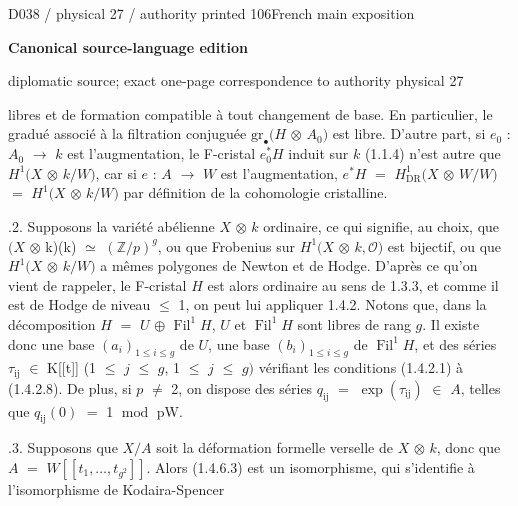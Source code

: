 \documentclass[9pt]{article}
\newcommand{\CanonText}[1]{\par{\fontsize{8.0}{9.35}\selectfont\RaggedRight #1\par}\vspace{2.2pt}}
\newcommand{\LayerTitle}{Canonical source-language edition}
\begin{document}
\noindent\begin{minipage}[t][\dimexpr\textheight-5pt\relax][t]{\textwidth}
{\sffamily\fontsize{7.3}{8.2}\selectfont\color{Quiet} D038 / physical 27 / authority printed 106\hfill French main exposition}
\par{}\vspace{4.5pt}
{\sffamily\fontsize{10.4}{11.6}\selectfont\bfseries\color{Accent} \LayerTitle}
\par{\sffamily\fontsize{6.7}{7.7}\selectfont\color{Quiet} diplomatic source; exact one-page correspondence to authority physical 27}
\vspace{5pt}
\CanonText{libres et de formation compatible à tout changement de base. En particulier, le gradué associé à la filtration conjuguée \(\text{gr}_\bullet{}(H\) \(\otimes{}\) \(A_{0})\) est libre. D'autre part, si \(e_{0}\) : \(A_{0}\) \(\to{}\) \(k\) est l'augmentation, le F-cristal \(e_{0}^{*}H\) induit sur \(k\) (1.1.4) n'est autre que \(H^{1}(X\) \(\otimes{}\) \(k/W)\), car si \(e\) : \(A\) \(\to{}\) \(W\) est l'augmentation, \(e^{*}H\) \(=\) \(H^{1}_{\mathrm{DR}}(X\) \(\otimes{}\) \(W/W)\) \(=\) \(H^{1}(X\) \(\otimes{}\) \(k/W)\) par définition de la cohomologie cristalline.}
\CanonText{2.1.2. Supposons la variété abélienne \(X\) \(\otimes{}\) \(k\) ordinaire, ce qui signifie, au choix, que \((X\) \(\otimes{}\) k)(k) \(\simeq{}\) \((\mathbb{Z}/p)^{g}\), ou que Frobenius sur \(H^{1}(X\) \(\otimes{}\) \(k,\mathcal{O})\) est bijectif, ou que \(H^{1}(X\) \(\otimes{}\) \(k/W)\) a mêmes polygones de Newton et de Hodge. D'après ce qu'on vient de rappeler, le F-cristal \(H\) est alors ordinaire au sens de 1.3.3, et comme il est de Hodge de niveau \(\leq{}\) 1, on peut lui appliquer 1.4.2. Notons que, dans la décomposition \(H\) \(=\) \(U\) \(\oplus{}\) \(\operatorname{Fil}^{1}H\), \(U\) et \(\operatorname{Fil}^{1}H\) sont libres de rang \(g\). Il existe donc une base \((a_{i})_{1\leq{}i\leq{}g}\) de \(U\), une base \((b_{i})_{1\leq{}i\leq{}g}\) de \(\operatorname{Fil}^{1}H\), et des séries \(\tau{}_{\mathrm{ij}}\) \(\in{}\) K[[t]] (1 \(\leq{}\) \(j\) \(\leq{}\) \(g\), 1 \(\leq{}\) \(j\) \(\leq{}\) \(g)\) vérifiant les conditions (1.4.2.1) à (1.4.2.8). De plus, si \(p\) \(\neq{}\) 2, on dispose des séries \(q_{\mathrm{ij}}\) \(=\) \(\operatorname{exp}(\tau{}_{\mathrm{ij}})\) \(\in{}\) \(A\), telles que \(q_{\mathrm{ij}}(0)\) \(=\) 1 \(\operatorname{mod}\) pW.}
\CanonText{2.1.3. Supposons que \(X/A\) soit la déformation formelle verselle de \(X\) \(\otimes{}\) \(k\), donc que \(A\) \(=\) \(W[[t_{1},\ldots{},t_{g^{2}}]]\). Alors (1.4.6.3) est un isomorphisme, qui s'identifie à l'isomorphisme de Kodaira-Spencer}

\end{minipage}
\end{document}
